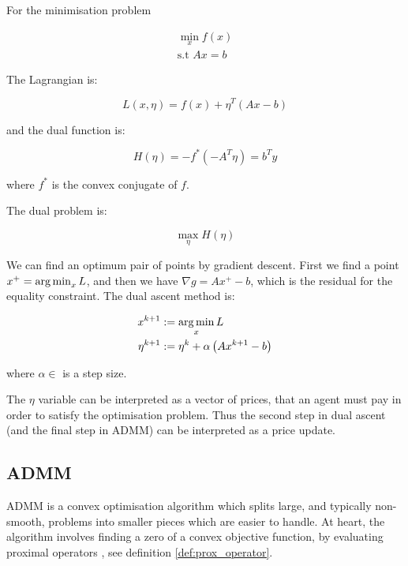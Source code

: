 \begin{example}

For the minimisation problem 

\begin{eqnarray}
\min_x f\left(x\right) \\
\text{s.t } Ax = b
\end{eqnarray}

The Lagrangian is:

\begin{equation}
L\left(x, \eta\right) = f\left(x\right) + \eta^T\left(Ax - b\right)
\end{equation}

and the dual function is:

\begin{equation}
H\left(\eta\right) = -f^*\left(-A^T\eta\right) = b^Ty
\end{equation}

where \(f^*\) is the convex conjugate of \(f\).

The dual problem is:

\begin{equation}
\max_{\eta} H\left(\eta\right)
\end{equation}

We can find an optimum pair of points by gradient descent. First we find a point \(x^+ = \operatorname*{arg\,min}_x L\), and then we have \(\nabla g = Ax^+ - b\), which is the residual for the equality constraint. The dual ascent method is:

\begin{align}
x^{k+1} &:= \operatorname*{arg\,min}_x L\\
\eta^{k+1} &:= \eta^{k} + \alpha \left(Ax^{k+1} -b \right)
\label{dual-ascent}
\end{align}

where \(\alpha \in \) is a step size.

The \(\eta\) variable can be interpreted as a vector of prices, that an agent must pay in order to satisfy the optimisation problem. Thus the second step in dual ascent (and the final step in ADMM) can be interpreted as a price update.

\end{example}

\subsection{ADMM}
ADMM is a convex optimisation algorithm which splits large, and typically non-smooth, problems into smaller pieces which are easier to handle. At heart, the algorithm involves finding a zero of a convex objective function, by evaluating proximal operators \cite{parikh2014proximal}, see definition \ref{def:prox_operator}. 

